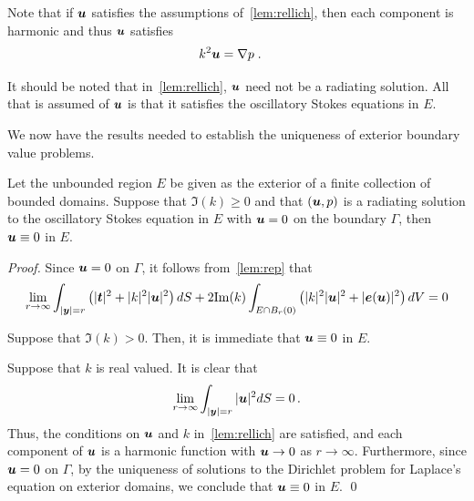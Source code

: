 \begin{remark} \label{rmk:harmu}
  Note that if ${\boldsymbol u}$ satisfies the assumptions
  of~\cref{lem:rellich}, then each component is harmonic
  and thus ${\boldsymbol u}$ satisfies
\begin{align}
k^2 {\boldsymbol u} &= \nabla p \label{eq:massconsred} \; .
\end{align}
\end{remark}

\begin{remark}
  It should be noted that in~\cref{lem:rellich}, ${\boldsymbol u}$ need
  not be a radiating solution. All that is assumed of ${\boldsymbol u}$
  is that it satisfies the oscillatory Stokes equations in $E$.
\end{remark}

We now have the results needed to establish the
uniqueness of exterior boundary value problems.

\begin{theorem}
  \label{thrm:unique_dir_ext}
  Let the unbounded region $E$ be given as the exterior
  of a finite collection of bounded domains.
  Suppose that $\Im(k)\geq 0$ and 
  that $({\boldsymbol u},p)$ is a radiating solution to the oscillatory Stokes
  equation in $E$ with ${\boldsymbol u} =0$ on the boundary $\Gamma$, then
  ${\boldsymbol u} \equiv 0$ in $E$.
\end{theorem}

\begin{proof}
Since ${\boldsymbol u} = 0$ on $\Gamma$, it follows from~\cref{lem:rep} that
\begin{equation}
\lim_{r\to\infty}
\int_{|{\boldsymbol y}|=r} \left( |{\boldsymbol t}|^2 + |k|^2 |{\boldsymbol u}|^2 \right) dS +
2 {\textrm{\textup{Im}}}(k) \int_{E \cap B_{r}(0)} \left(|k|^2 |{\boldsymbol u}|^2 + |{\boldsymbol e}({\boldsymbol u})|^2 \right)
dV = 0 \nonumber
\end{equation}

Suppose that $\Im(k) > 0$. Then, it is immediate that
${\boldsymbol u} \equiv 0$ in $E$.

Suppose that $k$ is real valued. It is clear that
\begin{equation}
\lim_{r\to\infty} \int_{|{\boldsymbol y}|=r} |{\boldsymbol u}|^2 dS = 0 \, . \nonumber
\end{equation}
Thus, the conditions on ${\boldsymbol u}$ and $k$ in~\cref{lem:rellich}
are satisfied, and each component of ${\boldsymbol u}$ is a harmonic function
with ${\boldsymbol u} \to 0$ as $r \to \infty$. Furthermore, since ${\boldsymbol u}=0$ on
$\Gamma$, by the uniqueness of solutions to the
Dirichlet problem for Laplace's equation
on exterior domains, we conclude that ${\boldsymbol u} \equiv 0$
in $E$.
\qed
\end{proof}

